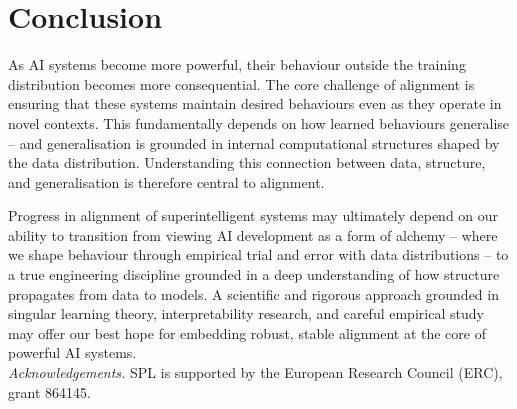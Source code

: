 \section{Conclusion}

As AI systems become more powerful, their behaviour outside the training distribution becomes more consequential. The core challenge of alignment is ensuring that these systems maintain desired behaviours even as they operate in novel contexts. This fundamentally depends on how learned behaviours generalise -- and generalisation is grounded in internal computational structures shaped by the data distribution. Understanding this connection between data, structure, and generalisation is therefore central to alignment.

Progress in alignment of superintelligent systems may ultimately depend on our ability to transition from viewing AI development as a form of alchemy -- where we shape behaviour through empirical trial and error with data distributions -- to a true engineering discipline grounded in a deep understanding of how structure propagates from data to models. A scientific and rigorous approach grounded in singular learning theory, interpretability research, and careful empirical study may offer our best hope for embedding robust, stable alignment at the core of powerful AI systems.
\\

\emph{Acknowledgements.} SPL is supported by the European Research Council (ERC), grant 864145.

